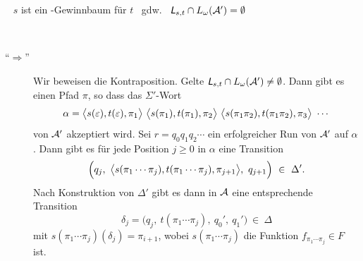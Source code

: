 \documentclass[fontsize=11pt, twoside=false, numbers=autoenddot]{scrbook}
\begin{document}
~
$s$ ist ein \PF-Gewinnbaum für $t$
~gdw.~
$\textsf{\textit{L}}_{s,t} \cap L_\omega(\mathcal{A}') = \emptyset$

\par\medskip
{}~
\begin{description}
  \item[{\boldmath"`$\Rightarrow$"'}]
    Wir beweisen die Kontraposition.
    Gelte $\textsf{\textit{L}}_{s,t} \cap L_\omega(\mathcal{A}') \neq \emptyset$.
    Dann gibt es einen Pfad $\pi$,
    so dass das $\Sigma'$-Wort
    \[
      \alpha = 
      \big\langle s(\varepsilon),t(\varepsilon),\pi_1\big\rangle~
      \big\langle s(\pi_1),t(\pi_1),\pi_2\big\rangle~
      \big\langle s(\pi_1\pi_2),t(\pi_1\pi_2),\pi_3\big\rangle~
      \cdots
    \]
    von $\mathcal{A}'$ akzeptiert wird.
    Sei $r=q_0q_1q_2\cdots$ ein erfolgreicher Run von $\mathcal{A}'$ auf $\alpha$.
    Dann gibt es für jede Position $j \geq 0$ in $\alpha$ eine Transition
    \[
      \Big(q_j,~\big\langle s(\pi_1\cdots\pi_j),t(\pi_1\cdots\pi_j),\pi_{j+1}\big\rangle,~q_{j+1}\Big) ~\in~ \Delta'.
    \]
    Nach Konstruktion von $\Delta'$ gibt es dann in $\mathcal{A}$ eine entsprechende Transition
    \[
      \delta_j = \Big(q_j,~t(\pi_1\cdots\pi_j),~q_0',~q_1'\Big) ~\in~ \Delta
    \]
    mit $s(\pi_1\cdots\pi_j)(\delta_j) = \pi_{i+1}$,
    wobei $s(\pi_1\cdots\pi_j)$ die Funktion $f_{\pi_1\cdots\pi_j} \in F$ ist.
    

\end{description}
\end{document}

